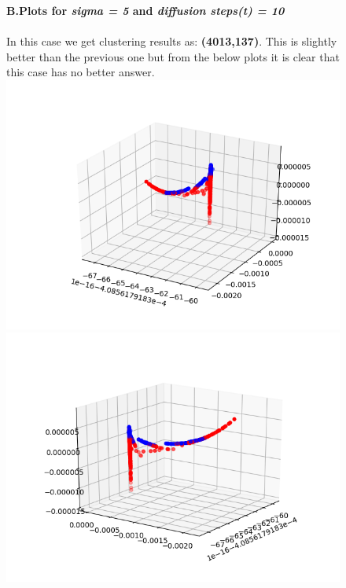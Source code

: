 \documentclass[12pt]{scrartcl}
\begin{document}
\begin{figure}[h]
\textbf{B.\quad Plots for \textit{sigma = 5} and \textit{diffusion steps(t) = 10}}
\\\\
In this case we get clustering results as: \textbf{(4013,137)}. This is slightly better than the previous one but from the below plots it is clear that this case has no better answer.\\    		
    		\includegraphics[scale=0.5]{5_10.png}
    		\includegraphics[scale=0.5]{5_10_.png}
    		
\end{figure}
\end{document}
